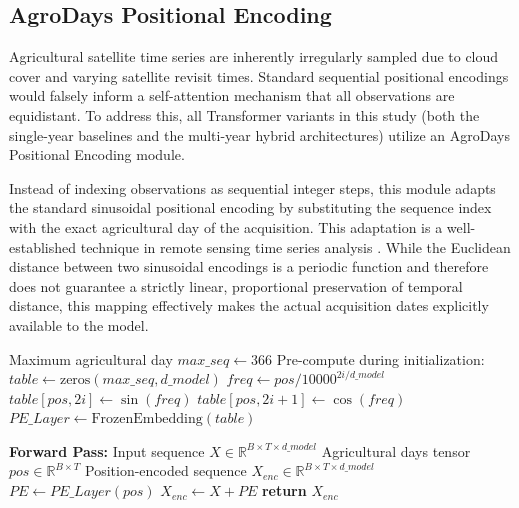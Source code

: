 \subsection{AgroDays Positional Encoding}
\label{subsec:agrodays_encoding}

Agricultural satellite time series are inherently irregularly sampled due to cloud cover and varying satellite revisit times.
Standard sequential positional encodings would falsely inform a self-attention mechanism that all observations are equidistant.
To address this, all Transformer variants in this study (both the single-year baselines and the multi-year hybrid architectures)
utilize an AgroDays Positional Encoding module.

Instead of indexing observations as sequential integer steps, this module adapts the standard sinusoidal positional
encoding \cite{attention_is_all_you_need} by substituting the sequence index with the exact agricultural day of the acquisition.
This adaptation is a well-established technique in remote sensing time series analysis \cite{russwurm_self_attention_2020, garnot2020psetae}.
While the Euclidean distance between two sinusoidal encodings is a periodic function and therefore does not guarantee a strictly linear,
proportional preservation of temporal distance, this mapping effectively makes the actual acquisition dates explicitly available to the model.

\begin{algorithm}[htpb]
    \caption{AgroDays Positional Encoding (Lookup Table)}
    \label{alg:agrodays}
    \begin{algorithmic}[1]
        \Require Maximum agricultural day $max\_seq \gets 366$
        \Require Pre-compute during initialization: 
        \State $table \gets \text{zeros}(max\_seq, d\_model)$
                \State $freq \gets pos / 10000^{2i/d\_model}$
                \State $table[pos, 2i] \gets \sin(freq)$
                \State $table[pos, 2i+1] \gets \cos(freq)$
            \EndFor
        \EndFor
        \State $PE\_Layer \gets \text{FrozenEmbedding}(table)$
        
        \vspace{1.5mm}
        \Require \textbf{Forward Pass:}
        \Require Input sequence $X \in \mathbb{R}^{B \times T \times d\_model}$
        \Require Agricultural days tensor $pos \in \mathbb{R}^{B \times T}$
        \Ensure Position-encoded sequence $X_{enc} \in \mathbb{R}^{B \times T \times d\_model}$
        \State $PE \gets PE\_Layer(pos)$ 
        \State $X_{enc} \gets X + PE$ 
        \State \textbf{return} $X_{enc}$
    \end{algorithmic}
\end{algorithm}

